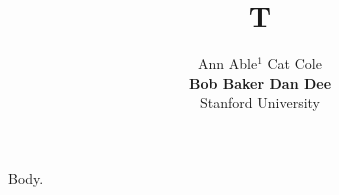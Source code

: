 \documentclass{article}
\begin{document}
\title{T}
\author{Ann Able$^{1}$ \quad Cat Cole \\ \textbf{Bob Baker \quad Dan Dee} \\ Stanford University}
\maketitle
Body.
\end{document}
